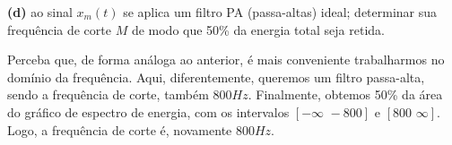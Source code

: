 \documentclass[10pt, a4paper]{article}
\begin{document}
\vspace{\baselineskip}

{\textbf{(d)}} ao sinal $x_{m}(t)$ se aplica um filtro PA (passa-altas) ideal; determinar sua frequência de corte $M$ de modo que 50\% da energia total seja retida.

Perceba que, de forma análoga ao anterior, é mais conveniente trabalharmos no domínio da frequência. Aqui, diferentemente, queremos um filtro passa-alta, sendo a frequência de corte, também $800Hz$. Finalmente, obtemos 50\% da área do gráfico de espectro de energia, com os intervalos $[-\infty\,\,-800]$ e $[800\,\,\infty]$. Logo, a frequência de corte é, novamente $800Hz$.
\end{document}
